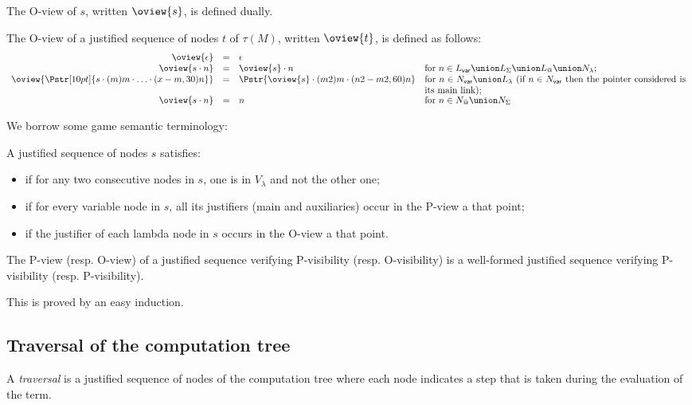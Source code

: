 The O-view of $s$, written $\oview{s}$, is defined dually.
\begin{definition}
\label{dfn:oview} The O-view of a justified sequence of nodes $t$ of
$\tau(M)$, written $\oview{t}$, is defined as follows:
$$\begin{array}{rcll}
 \oview{\epsilon} &=&  \epsilon \\
 \oview{s \cdot n }  &=&  \oview{s} \cdot n
    & \mbox{for $n \in L_{\sf var} \union L_\Sigma \union L_@ \union N_\lambda$;}
    \\
 \oview{\Pstr[10pt]{s \cdot (m){m} \cdot \ldots \cdot (x-m,30){n}}} &=&
    \Pstr{ \oview{s} \cdot (m2){m} \cdot (n2-m2,60){n} }
    & \parbox[t]{10cm}{for $n \in N_{\sf var} \union L_\lambda$ (if $n \in N_{\sf var}$ then the pointer considered is its main link);}
    \\
 \oview{s \cdot n }  &=&  n
    & \mbox{for $n \in N_@ \union N_\Sigma$ }
\end{array}$$
\end{definition}

We borrow some game semantic terminology:
\begin{definition} A justified sequence of nodes $s$ satisfies:
\begin{itemize}[-]
\item {} if for any two consecutive nodes in $s$, one is in $V_\lambda$ and not the other one;
\item {} if for every variable node in $s$, all its justifiers (main and auxiliaries) occur in the P-view a that point;
\item  {} if the justifier of each lambda node in $s$ occurs in the O-view a that point.
\end{itemize}
\end{definition}

\begin{property}
\label{proper:pview_visibility}
The P-view (resp. O-view) of a justified sequence verifying P-visibility (resp. O-visibility)
is a well-formed justified sequence verifying P-visibility (resp. P-visibility).
\end{property}
This is proved by an easy induction.


\subsection{Traversal of the computation tree}
\label{subsec:traversal}
A \emph{traversal} is a justified sequence of nodes of the computation tree where each node indicates a step that is taken during the evaluation of the term.

